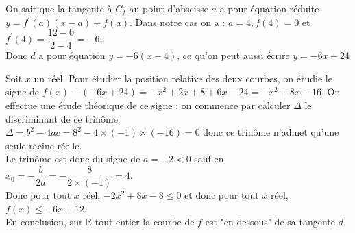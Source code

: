\documentclass[12pt,a5paper]{book}
\begin{document}
\begin{enumMet}
    \item On sait que la tangente à $C_{f}$ au point d'abscisse $a$ a pour équation réduite $y=f^{\prime}(a)(x-a)+f(a)$. Dans notre cas on a : $a=4, f(4)=0$ et $f^{\prime}(4)=\dfrac{12-0}{2-4}=-6$.\\ Donc $d$ a pour équation $y=-6(x-4)$, ce qu'on peut aussi écrire
$y=-6 x+24$
\item Soit $x$ un réel. Pour étudier la position relative des deux courbes, on étudie le signe de
$f(x)-(-6 x+24)=-x^{2}+2 x+8+6 x-24=-x^{2}+8 x-16$. On effectue une étude théorique de ce signe : on commence par calculer $\Delta$ le discriminant de ce trinôme.\\
$\Delta=b^{2}-4 a c=8^{2}-4 \times(-1) \times(-16)=0$ donc ce trinôme n'admet qu'une seule racine réelle.\\
Le trinôme est donc du signe de $a=-2<0$ sauf en $x_{0}=-\dfrac{b}{2 a}=-\dfrac{8}{2 \times(-1)}=4$.\\
Donc pour tout $x$ réel, $-2 x^{2}+8 x-8 \leqslant 0$ et donc pour
tout $x$ réel, $f(x) \leqslant-6 x+12$.\\
En conclusion, sur $\mathbb{R}$ tout entier la courbe de $f$ est "en dessous" de sa tangente $d$.
\end{enumMet}

\end{document}
